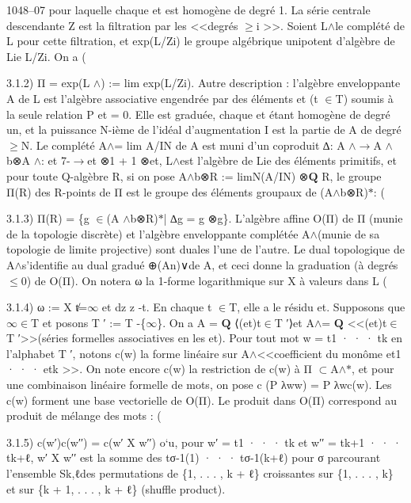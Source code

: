 \documentclass[11pt]{article}
\begin{document}
1048--07 pour laquelle chaque et est homogène de degré 1. La série centrale descendante Z est la filtration par les <<degrés \(\ge\)i >>. Soient L\(\wedge\)le complété de L pour cette filtration, et exp(L/Zi) le groupe algébrique unipotent d’algèbre de Lie L/Zi. On a (

3.1.2) Π = exp(L \(\wedge\)) := lim exp(L/Zi). Autre description : l’algèbre enveloppante A de L est l’algèbre associative engendrée par des éléments et (t \(\in\)T) soumis à la seule relation P et = 0. Elle est graduée, chaque et étant homogène de degré un, et la puissance N-ième de l’idéal d’augmentation I est la partie de A de degré \(\ge\)N. Le complété A\(\wedge\)= lim A/IN de A est muni d’un coproduit ∆: A \(\wedge\)\(\to\)A \(\wedge\)b⊗A \(\wedge\): et 7-\(\to\)et ⊗1 + 1 ⊗et, L\(\wedge\)est l’algèbre de Lie des éléments primitifs, et pour toute Q-algèbre R, si on pose A\(\wedge\)b⊗R := limN(A/IN) ⊗\(\mathbf Q\) R, le groupe Π(R) des R-points de Π est le groupe des éléments groupaux de (A\(\wedge\)b⊗R)\(*\): (

3.1.3) Π(R) = \{g \(\in\)(A \(\wedge\)b⊗R)\(*\)| ∆g = g ⊗g\}. L’algèbre affine O(Π) de Π (munie de la topologie discrète) et l’algèbre enveloppante complétée A\(\wedge\)(munie de sa topologie de limite projective) sont duales l’une de l’autre. Le dual topologique de A\(\wedge\)s’identifie au dual gradué ⊕(An)∨de A, et ceci donne la graduation (à degrés \(\le\)0) de O(Π). On notera ω la 1-forme logarithmique sur X à valeurs dans L (

3.1.4) ω := X t̸=\(\infty\) et dz z -t. En chaque t \(\in\)T, elle a le résidu et. Supposons que \(\infty\)\(\in\)T et posons T ′ := T -\{\(\infty\)\}. On a A = \(\mathbf Q\) ⟨(et)t\(\in\)T ′⟩et A\(\wedge\)= \(\mathbf Q\) <<(et)t\(\in\)T ′>>(séries formelles associatives en les et). Pour tout mot w = t1 · · · tk en l’alphabet T ′, notons c(w) la forme linéaire sur A\(\wedge\)<<coefficient du monôme et1 · · · etk >>. On note encore c(w) la restriction de c(w) à Π \(\subset\)A\(\wedge\)\(*\), et pour une combinaison linéaire formelle de mots, on pose c (P λww) = P λwc(w). Les c(w) forment une base vectorielle de O(Π). Le produit dans O(Π) correspond au produit de mélange des mots : (

3.1.5) c(w′)c(w′′) = c(w′ X w′′) o`u, pour w′ = t1 · · · tk et w′′ = tk+1 · · · tk+ℓ, w′ X w′′ est la somme des tσ-1(1) · · · tσ-1(k+ℓ) pour σ parcourant l’ensemble Sk,ℓdes permutations de \{1, . . . , k + ℓ\} croissantes sur \{1, . . . , k\} et sur \{k + 1, . . . , k + ℓ\} (shuﬄe product).
\end{document}
